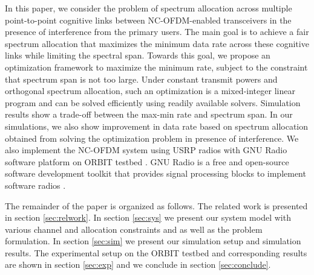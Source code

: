 \documentclass[conference]{IEEEtran}
\begin{document}
In this paper, we consider the problem of  spectrum allocation across multiple point-to-point cognitive links between  NC-OFDM-enabled transceivers in the presence of interference from the primary users. The main goal is to achieve a fair spectrum allocation that maximizes the minimum data rate across these cognitive links while limiting the spectral span. Towards this goal, we propose an optimization framework to maximize the minimum rate, subject to the constraint that spectrum span is not too large. Under constant transmit powers and orthogonal spectrum allocation, such an optimization is a mixed-integer linear program and can be solved efficiently using readily available solvers. Simulation results show a trade-off between the max-min rate and spectrum span. In our simulations, we also show improvement in data rate based on spectrum allocation obtained from solving the optimization problem in presence of interference. We also implement the NC-OFDM system using USRP \cite{ettus} radios with GNU Radio software platform on ORBIT testbed \cite{ray06cognet}. GNU Radio is a free and open-source software development toolkit that provides signal processing blocks to implement software radios \cite{gnuradio}. 
 


The remainder of the paper is organized as follows. The related work is presented in section \ref{sec:relwork}. In section \ref{sec:sys} we present  our system model with various channel and allocation constraints and as well as the  problem formulation. In section \ref{sec:sim} we present our simulation setup and  simulation results. The experimental setup on the  ORBIT testbed and corresponding results are shown in section \ref{sec:exp} and we  conclude in section \ref{sec:conclude}.
\end{document}
